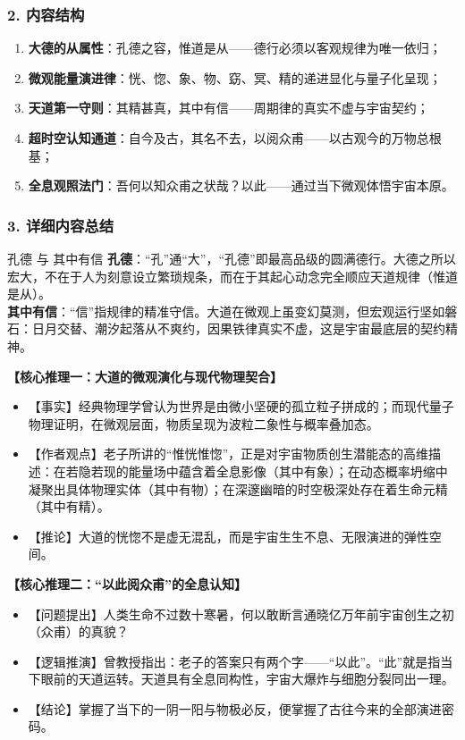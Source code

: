 \subsubsection{2. 内容结构}
\begin{enumerate}
    \item \textbf{大德的从属性}：孔德之容，惟道是从——德行必须以客观规律为唯一依归；
    \item \textbf{微观能量演进律}：恍、惚、象、物、窈、冥、精的递进显化与量子化呈现；
    \item \textbf{天道第一守则}：其精甚真，其中有信——周期律的真实不虚与宇宙契约；
    \item \textbf{超时空认知通道}：自今及古，其名不去，以阅众甫——以古观今的万物总根基；
    \item \textbf{全息观照法门}：吾何以知众甫之状哉？以此——通过当下微观体悟宇宙本原。
\end{enumerate}

\subsubsection{3. 详细内容总结}

\begin{ConceptBox}{孔德 与 其中有信}
\textbf{孔德}：“孔”通“大”，“孔德”即最高品级的圆满德行。大德之所以宏大，不在于人为刻意设立繁琐规条，而在于其起心动念完全顺应天道规律（惟道是从）。\\
\textbf{其中有信}：“信”指规律的精准守信。大道在微观上虽变幻莫测，但宏观运行坚如磐石：日月交替、潮汐起落从不爽约，因果铁律真实不虚，这是宇宙最底层的契约精神。
\end{ConceptBox}

\noindent\textbf{【核心推理一：大道的微观演化与现代物理契合】}
\begin{itemize}
    \item 【事实】经典物理学曾认为世界是由微小坚硬的孤立粒子拼成的；而现代量子物理证明，在微观层面，物质呈现为波粒二象性与概率叠加态。
    \item 【作者观点】老子所讲的“惟恍惟惚”，正是对宇宙物质创生潜能态的高维描述：在若隐若现的能量场中蕴含着全息影像（其中有象）；在动态概率坍缩中凝聚出具体物理实体（其中有物）；在深邃幽暗的时空极深处存在着生命元精（其中有精）。
    \item 【推论】大道的恍惚不是虚无混乱，而是宇宙生生不息、无限演进的弹性空间。
\end{itemize}

\noindent\textbf{【核心推理二：“以此阅众甫”的全息认知】}
\begin{itemize}
    \item 【问题提出】人类生命不过数十寒暑，何以敢断言通晓亿万年前宇宙创生之初（众甫）的真貌？
    \item 【逻辑推演】曾教授指出：老子的答案只有两个字——“以此”。“此”就是指当下眼前的天道运转。天道具有全息同构性，宇宙大爆炸与细胞分裂同出一理。
    \item 【结论】掌握了当下的一阴一阳与物极必反，便掌握了古往今来的全部演进密码。
\end{itemize}

